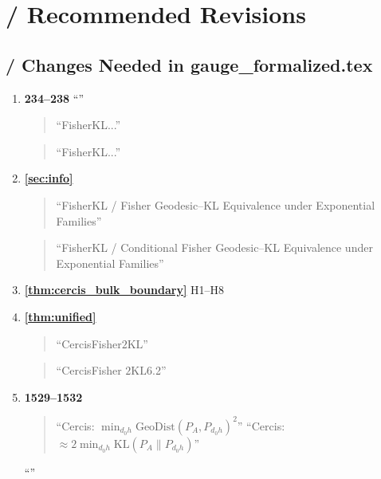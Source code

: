 \documentclass{article}
\newcommand{\GeoDist}{\mathrm{GeoDist}}
\newcommand{\KL}{\mathrm{KL}}
\begin{document}
\section{ / Recommended Revisions}

\subsection{ / Changes Needed in gauge\_formalized.tex}

\begin{enumerate}[label=(\arabic*)]

    \item \textbf{234--238}
    ``''
    \begin{quote}
        ``FisherKL...''
    \end{quote}
    
    \begin{quote}
        ``FisherKL...''
    \end{quote}
    

    \item \textbf{\ref{sec:info}}
    
    \begin{quote}
        ``FisherKL / Fisher Geodesic--KL Equivalence under Exponential Families''
    \end{quote}
    
    \begin{quote}
        ``FisherKL / Conditional Fisher Geodesic--KL Equivalence under Exponential Families''
    \end{quote}

    \item \textbf{\ref{thm:cercis_bulk_boundary}}
    H1--H8

    \item \textbf{\ref{thm:unified}}
    
    \begin{quote}
        ``CercisFisher$2\KL$''
    \end{quote}
    
    \begin{quote}
        ``CercisFisher
        $2\KL$6.2''
    \end{quote}

    \item \textbf{1529--1532}
    
    \begin{quote}
        ``Cercis: $\min_{d_0 h} \GeoDist(P_A, P_{d_0 h})^2$'' 
        ``Cercis: $\approx 2\min_{d_0 h} \KL(P_A \| P_{d_0 h})$''
    \end{quote}
    ``''


\end{enumerate}
\end{document}
